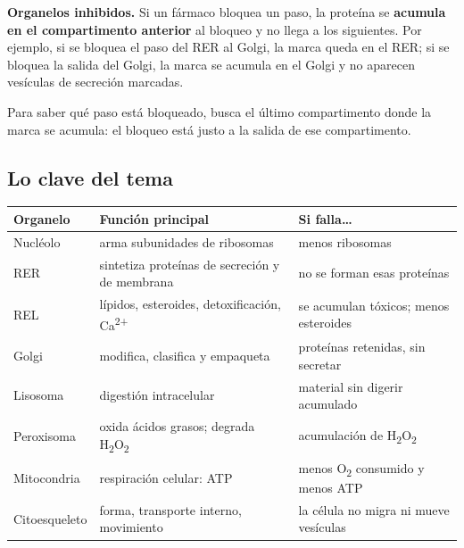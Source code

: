   

\textbf{Organelos inhibidos.} Si un fármaco bloquea un paso, la proteína se \textbf{acumula en el compartimento anterior} al bloqueo y no llega a los siguientes. Por ejemplo, si se bloquea el paso del RER al Golgi, la marca queda en el RER; si se bloquea la salida del Golgi, la marca se acumula en el Golgi y no aparecen vesículas de secreción marcadas.

 
\begin{clave}[{Recuerda}] Para saber qué paso está bloqueado, busca el último compartimento donde la marca se acumula: el bloqueo está justo a la salida de ese compartimento.\end{clave}
\subsection{Lo clave del tema}
\begin{center}\small
\begin{tabularx}{\linewidth}{@{}>{\raggedright\arraybackslash\hsize=0.52\hsize}X>{\raggedright\arraybackslash\hsize=1.29\hsize}X>{\raggedright\arraybackslash\hsize=1.19\hsize}X@{}}
\toprule
\textbf{Organelo} & \textbf{Función principal} & \textbf{Si falla\dots{}} \\
\midrule
Nucléolo & arma subunidades de ribosomas & menos ribosomas \\
RER & sintetiza proteínas de secreción y de membrana & no se forman esas proteínas \\
REL & lípidos, esteroides, detoxificación, Ca\textsuperscript{2+} & se acumulan tóxicos; menos esteroides \\
Golgi & modifica, clasifica y empaqueta & proteínas retenidas, sin secretar \\
Lisosoma & digestión intracelular & material sin digerir acumulado \\
Peroxisoma & oxida ácidos grasos; degrada H\textsubscript{2}O\textsubscript{2} & acumulación de H\textsubscript{2}O\textsubscript{2} \\
Mitocondria & respiración celular: ATP & menos O\textsubscript{2} consumido y menos ATP \\
Citoesqueleto & forma, transporte interno, movimiento & la célula no migra ni mueve vesículas \\
\bottomrule
\end{tabularx}
\end{center}
 
